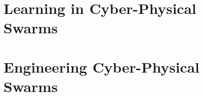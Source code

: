 \documentclass[12pt,a4paper,oneside]{book}
\begin{document}
\part{Learning in Cyber-Physical Swarms}
\begin{refsection}%

\printbibliography
\end{refsection}
\part{Engineering Cyber-Physical Swarms}
\begin{refsection}%


\printbibliography

\end{refsection}


\end{document}
